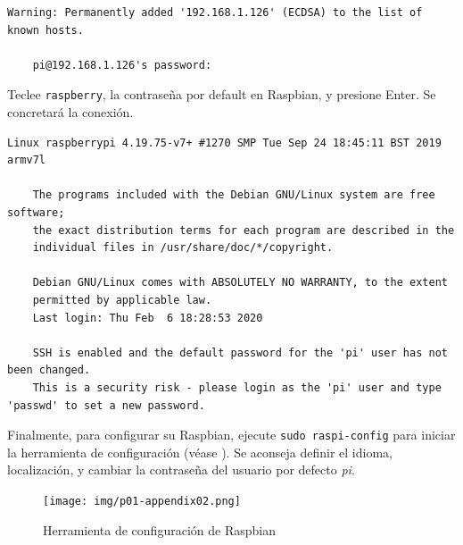 \documentclass[letterpaper,10.5pt]{article}
\begin{document}
\begin{Verbatim}[fontsize=\footnotesize]
    Warning: Permanently added '192.168.1.126' (ECDSA) to the list of known hosts.

    pi@192.168.1.126's password:
\end{Verbatim}

Teclee \texttt{raspberry}, la contraseña por default en Raspbian, y presione Enter.
Se concretará la conexión.

\begin{Verbatim}[fontsize=\footnotesize]
    Linux raspberrypi 4.19.75-v7+ #1270 SMP Tue Sep 24 18:45:11 BST 2019 armv7l

    The programs included with the Debian GNU/Linux system are free software;
    the exact distribution terms for each program are described in the
    individual files in /usr/share/doc/*/copyright.

    Debian GNU/Linux comes with ABSOLUTELY NO WARRANTY, to the extent
    permitted by applicable law.
    Last login: Thu Feb  6 18:28:53 2020

    SSH is enabled and the default password for the 'pi' user has not been changed.
    This is a security risk - please login as the 'pi' user and type 'passwd' to set a new password.
\end{Verbatim}

Finalmente, para configurar su Raspbian, ejecute \texttt{sudo raspi-config}  para iniciar la herramienta de configuración (véase ).
Se aconseja definir el idioma, localización, y cambiar la contraseña del usuario por defecto \textit{pi}.

\begin{figure}[H]
	\centering%
	\texttt{[image: img/p01-appendix02.png]} %
	\caption{Herramienta de configuración de Raspbian}
	\label{fig:raspberry-config-tool} %
\end{figure}
\end{document}
